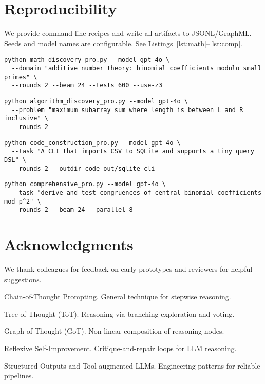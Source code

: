 \documentclass[11pt]{article}
\begin{document}
\section*{Reproducibility}
We provide command-line recipes and write all artifacts to JSONL/GraphML.
Seeds and model names are configurable. See Listings~\ref{lst:math}--\ref{lst:comp}.

\begin{lstlisting}[style=code,caption={Math discovery example},label={lst:math}]
python math_discovery_pro.py --model gpt-4o \
  --domain "additive number theory: binomial coefficients modulo small primes" \
  --rounds 2 --beam 24 --tests 600 --use-z3
\end{lstlisting}

\begin{lstlisting}[style=code,caption={Algorithm discovery example},label={lst:algo}]
python algorithm_discovery_pro.py --model gpt-4o \
  --problem "maximum subarray sum where length is between L and R inclusive" \
  --rounds 2
\end{lstlisting}

\begin{lstlisting}[style=code,caption={Code construction example},label={lst:code}]
python code_construction_pro.py --model gpt-4o \
  --task "A CLI that imports CSV to SQLite and supports a tiny query DSL" \
  --rounds 2 --outdir code_out/sqlite_cli
\end{lstlisting}

\begin{lstlisting}[style=code,caption={Comprehensive orchestrator},label={lst:comp}]
python comprehensive_pro.py --model gpt-4o \
  --task "derive and test congruences of central binomial coefficients mod p^2" \
  --rounds 2 --beam 24 --parallel 8
\end{lstlisting}

\section*{Acknowledgments}
We thank colleagues for feedback on early prototypes and reviewers for helpful suggestions.

\begin{thebibliography}{9}
\bibitem{cot}
Chain-of-Thought Prompting. General technique for stepwise reasoning.

Tree-of-Thought (ToT). Reasoning via branching exploration and voting.

Graph-of-Thought (GoT). Non-linear composition of reasoning nodes.

\bibitem{reflexion}
Reflexive Self-Improvement. Critique-and-repair loops for LLM reasoning.

\bibitem{routines}
Structured Outputs and Tool-augmented LLMs. Engineering patterns for reliable pipelines.
\end{thebibliography}
\end{document}
